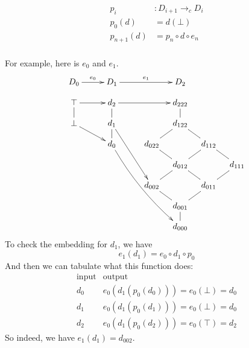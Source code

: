 \documentclass{tufte-handout}
\begin{document}
\begin{center}
\begin{minipage}{0.5\textwidth}
\begin{align*}
  p_i &: D_{i+1} \to_c D_i  \\
  p_0(d) &= d(\bot) \\
  p_{n+1}(d) &= p_n \circ d \circ e_n\\
\end{align*}
\end{minipage}
\begin{minipage}{0.5\textwidth}
\end{minipage} 
\end{center}

For example, here is $e_0$ and $e_1$.
\[
\xymatrix@=10pt{
  D_0 \ar[rr]^{e_0}&& D_1 \ar[rrr]^{e_1}& & & D_2 \\
     \top \ar@{-}[d] \ar[rr]&& d_2 \ar@{-}[d] \ar[rrr] &&     & d_{222} \ar@{-}[d]\\
     \bot \ar[drr]&& d_1 \ar@{-}[d] \ar[rrddd] &  &   & d_{122} \ar@{-}[dl] \ar@{-}[dr]\\
     && d_0 \ar@/_/[rrrdddd] && d_{022} \ar@{-}[dr]&     & d_{112} \ar@{-}[dl] \ar@{-}[dr]\\
     && &  &   & d_{012} \ar@{-}[dl]\ar@{-}[dr]&      & d_{111} \ar@{-}[dl]\\
     && & &d_{002} \ar@{-}[dr]&     & d_{011} \ar@{-}[dl]\\
     && & &    & d_{001} \ar@{-}[d]\\
     && & &    & d_{000} 
    } 
\]
To check the embedding for $d_1$, we have
\[
  e_1(d_1) = e_0 \circ d_1 \circ p_0
\]
And then we can tabulate what this function does:
\[
\begin{array}{cc}
  \text{input} & \text{output} \\
  d_0 & e_0(d_1(p_0(d_0))) = e_0(\bot) = d_0 \\
  d_1 & e_0(d_1(p_0(d_1))) = e_0(\bot) = d_0 \\
  d_2 & e_0(d_1(p_0(d_2))) = e_0(\top) = d_2
\end{array}
\]
So indeed, we have $e_1(d_1) = d_{002}$.




\end{document}
